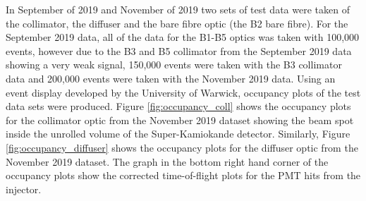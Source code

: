 In September of 2019 and November of 2019 two sets of test data were taken of the collimator, the diffuser and the bare fibre optic (the B2 bare fibre). For the September 2019 data, all of the data for the B1-B5 optics was taken with 100,000 events, however due to the B3 and B5 collimator from the September 2019 data showing a very weak signal, 150,000 events were taken with the B3 collimator data and 200,000 events were taken with the November 2019 data. Using an event display developed by the University of Warwick, occupancy plots of the test data sets were produced. Figure \ref{fig:occupancy_coll} shows the occupancy plots for the collimator optic from the November 2019 dataset showing the beam spot inside the unrolled volume of the Super-Kamiokande detector. Similarly, Figure \ref{fig:occupancy_diffuser} shows the occupancy plots for the diffuser optic from the November 2019 dataset. The graph in the bottom right hand corner of the occupancy plots show the corrected time-of-flight plots for the PMT hits from the injector. 

